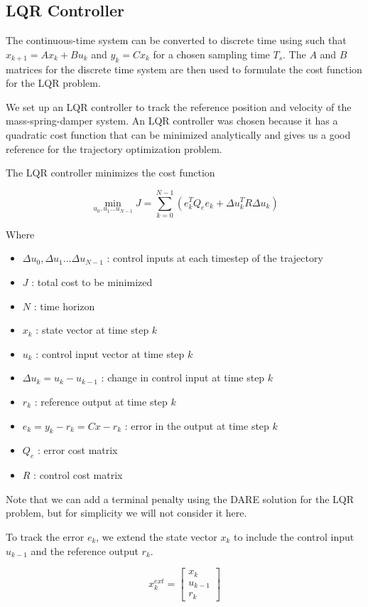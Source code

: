 \documentclass{article}
\begin{document}
\subsection{LQR Controller} \label{lqr_ctrl}
The continuous-time system can be converted to discrete time using such that $x_{k+1} = A x_k + B u_k$ and $y_k = C x_k$ for a chosen sampling time $T_s$.
The $A$ and $B$ matrices for the discrete time system are then used to formulate the cost function for the LQR problem.

We set up an LQR controller to track the reference position and velocity of the mass-spring-damper system.
An LQR controller was chosen because it has a quadratic cost function that can be minimized analytically and gives us a
good reference for the trajectory optimization problem.

The LQR controller minimizes the cost function

$$
\min_{u_0, u_1 ... u_{N-1}}J = \sum_{k=0}^{N-1} (e_k^T Q_e e_k + \Delta u_k^T R \Delta u_k)
$$

Where

\begin{itemize}
  \item $\Delta u_0, \Delta u_1 ... \Delta u_{N-1}$ : control inputs at each timestep of the trajectory
  \item $J$ : total cost to be minimized
  \item $N$ : time horizon
  \item $x_k$ : state vector at time step $k$
  \item $u_k$ : control input vector at time step $k$
  \item $\Delta u_k = u_k - u_{k-1}$ : change in control input at time step $k$
  \item $r_k$ : reference output at time step $k$
  \item $e_k = y_k - r_k = Cx - r_k$ : error in the output at time step $k$
  \item $Q_e$ : error cost matrix
  \item $R$ : control cost matrix
\end{itemize}

Note that we can add a terminal penalty using the DARE solution for the LQR problem, but for simplicity we will not consider it here.

To track the error $e_k$, we extend the state vector $x_k$ to include the control input $u_{k-1}$ and the reference output $r_k$.

$$
x_k^{ext} =
\begin{bmatrix}
  x_k \\
  u_{k-1} \\
  r_k
\end{bmatrix}
$$
\end{document}
